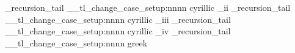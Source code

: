     { \q_recursion_tail }
  \__tl_change_case_setup:nnnn
    { cyrillic }
    { _ii }
    {
      \cyrh         \CYRH
      \cyrhdsc      \CYRHDSC
      \cyrhhcrs     \CYRHHCRS
      \cyrhhk       \CYRHHK
      \cyrhrdsn     \CYRHRDSN
      \cyri         \CYRI
      \cyrie        \CYRIE
      \cyrii        \CYRII
      \cyrishrt     \CYRISHRT
      \cyrishrtdsc  \CYRISHRTDSC
      \cyrizh       \CYRIZH
      \cyrje        \CYRJE
      \cyrk         \CYRK
      \cyrkbeak     \CYRKBEAK
      \cyrkdsc      \CYRKDSC
      \cyrkhcrs     \CYRKHCRS
      \cyrkhk       \CYRKHK
      \cyrkvcrs     \CYRKVCRS
      \cyrl         \CYRL
      \cyrldsc      \CYRLDSC
      \cyrlhk       \CYRLHK
      \cyrlje       \CYRLJE
      \cyrm         \CYRM
      \cyrmdsc      \CYRMDSC
      \cyrmhk       \CYRMHK
      \cyrn         \CYRN
      \cyrndsc      \CYRNDSC
      \cyrng        \CYRNG
      \cyrnhk       \CYRNHK
      \cyrnje       \CYRNJE
      \cyrnlhk      \CYRNLHK
    }
    { \q_recursion_tail }
  \__tl_change_case_setup:nnnn
    { cyrillic }
    { _iii }
    {
      \cyro         \CYRO
      \cyrotld      \CYROTLD
      \cyrp         \CYRP
      \cyrphk       \CYRPHK
      \cyrq         \CYRQ
      \cyrr         \CYRR
      \cyrrdsc      \CYRRDSC
      \cyrrhk       \CYRRHK
      \cyrrtick     \CYRRTICK
      \cyrs         \CYRS
      \cyrsacrs     \CYRSACRS
      \cyrschwa     \CYRSCHWA
      \cyrsdsc      \CYRSDSC
      \cyrsemisftsn \CYRSEMISFTSN
      \cyrsftsn     \CYRSFTSN
      \cyrsh        \CYRSH
      \cyrshch      \CYRSHCH
      \cyrshha      \CYRSHHA
      \cyrt         \CYRT
      \cyrtdsc      \CYRTDSC
      \cyrtetse     \CYRTETSE
      \cyrtshe      \CYRTSHE
      \cyru         \CYRU
      \cyrushrt     \CYRUSHRT
    }
    { \q_recursion_tail }
  \__tl_change_case_setup:nnnn
    { cyrillic }
    { _iv }
    {
      \cyrv         \CYRV
      \cyrw         \CYRW
      \cyry         \CYRY
      \cyrya        \CYRYA
      \cyryat       \CYRYAT
      \cyryhcrs     \CYRYHCRS
      \cyryi        \CYRYI
      \cyryo        \CYRYO
      \cyryu        \CYRYU
      \cyrz         \CYRZ
      \cyrzdsc      \CYRZDSC
      \cyrzh        \CYRZH
      \cyrzhdsc     \CYRZHDSC
    }
    { \q_recursion_tail }
  \__tl_change_case_setup:nnnn
    { greek }
    { }
    {
      \textalpha     \textAlpha
      \textbeta      \textBeta
      \textchi       \textChi
      \textdelta     \textDelta
      \textdigamma   \textDigamma
      \texteta       \textEta
      \textepsilon   \textEpsilon
      \textgamma     \textGamma
      \textiota      \textIota
      \textkappa     \textKappa
      \textlambda    \textLambda
      \textmu        \textMu
      \textnu        \textNu
      \textomega     \textOmega
      \textomicron   \textOmicron
      \textphi       \textPhi
      \textpi        \textPi
      \textpsi       \textPsi
      \textqoppa     \textQoppa
      \textrho       \textRho
      \textsampi     \textSampi
      \textautosigma \textSigma
      \textstigma    \textStigma
      \texttheta     \textTheta
      \texttau       \textTau
      \textupsilon   \textUpsilon
      \textxi        \textXi
      \textzeta      \textZeta
      \textsigma     \textSigma
      \textvarsigma  \textSigma
      \textvarstigma \textStigma
    }
